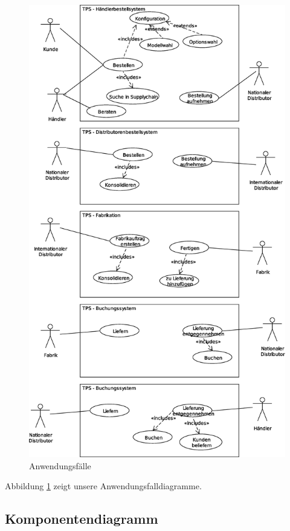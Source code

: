 \documentclass[a4paper,10pt,left=4.5cm,right=3cm,top=1cm,bottom=2cm]{article}
\begin{document}
\begin{figure}[htb]
 \begin{center}
   \includegraphics[width=1\textwidth]{usecases}
    \caption{Anwendungsfälle}
    \label{anwendungsfalldiagramme}
  \end{center}
\end{figure}

Abbildung \ref{anwendungsfalldiagramme} zeigt unsere Anwendungsfalldiagramme.

\subsection{Komponentendiagramm}
\end{document}
